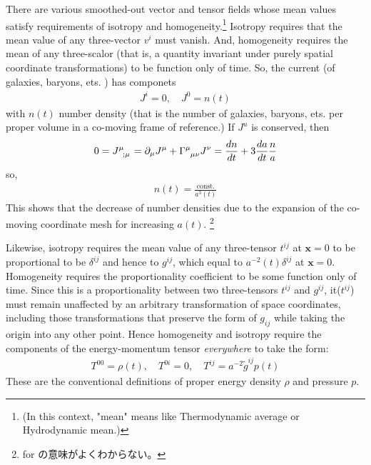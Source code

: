 \documentclass[11pt]{ltjsarticle}
\theoremstyle{plain}
\theoremstyle{break}
\newcommand{\mbfx}{\mathbf{x}}
\newcommand{\tilg}{\tilde{g}}
\begin{document}
There are various smoothed-out vector and tensor fields whose mean values satisfy requirements of isotropy and homogeneity.\footnote{(In this context, "mean" means like Thermodynamic average or Hydrodynamic mean.)}
Isotropy requires that the mean value of any three-vector $v^i$ must vanish.
And, homogeneity requires the mean of any three-scalor (that is, a quantity invariant under purely spatial coordinate transformations) to be function only of time.
So, the current (of galaxies, baryons, ets. ) has componets
\begin{align}
J^i =0 ,\quad J^0 = n(t)
\end{align}%
with $n(t)$ number density (that is the number of galaxies, baryons, ets. per proper volume in a co-moving frame of reference.)
If $J^u$ is conserved, then
\begin{align}
0= \tensor{J}{^\mu_{;\mu}} = \partial_\mu J^\mu + \tensor{\Gamma}{^\mu_{\mu \nu}} J^\nu= \frac{dn}{dt} + 3\frac{da}{dt} \frac{n}{a}
\end{align}
so,
\begin{align}
n(t) = \frac{\mathrm{const.}}{a^3(t)}
\end{align}
This shows that  the decrease of number densities due to the expansion of the co-moving coordinate mesh for increasing $a(t)$.
\footnote{for の意味がよくわからない。}

Likewise, isotropy requires the mean value of any three-tensor $t^{ij}$ at $\mbfx=0$ to be proportional to be $\delta^{ij}$ and hence to $g^{ij}$, which equal to $a^{-2}(t) \delta^{ij}$ at $\mbfx=0$.
Homogeneity requires the proportionality coefficient to be some function only of time.
Since this is a proportionality between two three-tensors $t^{ij}$ and $g^{ij}$,
it($t^{ij}$) must remain unaffected by an arbitrary transformation of space coordinates, including those transformations that preserve the form of $g_{ij}$ while taking the origin into any other point.
Hence homogeneity and isotropy require the components of the energy-momentum tensor \textit{everywhere} to take the form:
\begin{align}
  T^{00} = \rho(t),\quad T^{0i} = 0,\quad T^{ij} = a^{-2} \tilg^{ij} p(t)
\end{align}
These are the conventional definitions of proper energy density $\rho$ and pressure $p$.
\end{document}
